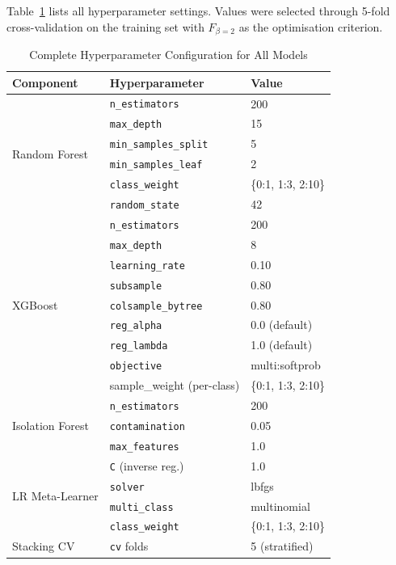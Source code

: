 \documentclass[conference]{IEEEtran}
\begin{document}
Table~\ref{tab:hyperparams} lists all hyperparameter settings.
Values were selected through 5-fold cross-validation on the training set with
$F_{\beta=2}$ as the optimisation criterion.

\begin{table}[t]
\centering
\caption{Complete Hyperparameter Configuration for All Models}
\label{tab:hyperparams}
\renewcommand{\arraystretch}{1.1}
\begin{tabular}{l l l}
\toprule
\textbf{Component} & \textbf{Hyperparameter} & \textbf{Value} \\
\midrule
\multirow{6}{*}{Random Forest}
  & \texttt{n\_estimators}    & 200 \\
  & \texttt{max\_depth}       & 15 \\
  & \texttt{min\_samples\_split} & 5 \\
  & \texttt{min\_samples\_leaf}  & 2 \\
  & \texttt{class\_weight}    & \{0:1, 1:3, 2:10\} \\
  & \texttt{random\_state}    & 42 \\
\midrule
\multirow{9}{*}{XGBoost}
  & \texttt{n\_estimators}     & 200 \\
  & \texttt{max\_depth}        & 8 \\
  & \texttt{learning\_rate}    & 0.10 \\
  & \texttt{subsample}         & 0.80 \\
  & \texttt{colsample\_bytree} & 0.80 \\
  & \texttt{reg\_alpha}        & 0.0 (default) \\
  & \texttt{reg\_lambda}       & 1.0 (default) \\
  & \texttt{objective}         & multi:softprob \\
  & sample\_weight (per-class) & \{0:1, 1:3, 2:10\} \\
\midrule
\multirow{3}{*}{Isolation Forest}
  & \texttt{n\_estimators}  & 200 \\
  & \texttt{contamination}  & 0.05 \\
  & \texttt{max\_features}  & 1.0 \\
\midrule
\multirow{4}{*}{LR Meta-Learner}
  & \texttt{C} (inverse reg.) & 1.0 \\
  & \texttt{solver}           & lbfgs \\
  & \texttt{multi\_class}     & multinomial \\
  & \texttt{class\_weight}    & \{0:1, 1:3, 2:10\} \\
\midrule
Stacking CV & \texttt{cv} folds        & 5 (stratified) \\
\bottomrule
\end{tabular}
\end{table}
\end{document}
